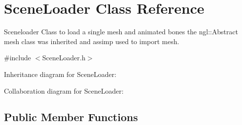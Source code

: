 \hypertarget{class_scene_loader}{\section{Scene\-Loader Class Reference}
\label{class_scene_loader}
}


Sceneloader Class to load a single mesh and animated bones the ngl\-::\-Abstract mesh class was inherited and assimp used to import mesh.  




{\ttfamily \#include $<$Scene\-Loader.\-h$>$}



Inheritance diagram for Scene\-Loader\-:


Collaboration diagram for Scene\-Loader\-:
\subsection*{Public Member Functions}
